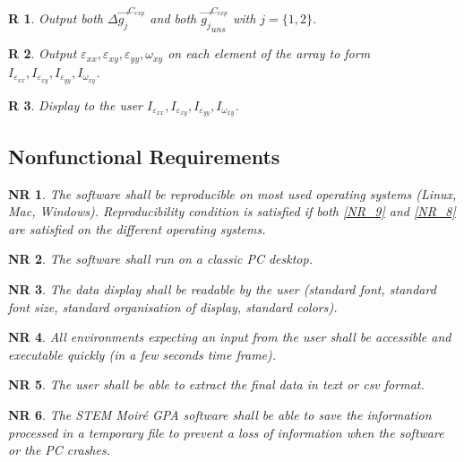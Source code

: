 \documentclass[12pt]{article}
\newcommand{\progname}{STEM Moir{\'e} GPA}
\newtheorem{R}{R}
\newtheorem{NR}{NR}
\begin{document}
\begin{R}
\label{R_12}
\normalfont Output both  $\Delta \overrightarrow{g_{j}}^{C_{exp}}$ and both $\overrightarrow{g_{j}}_{uns}^{C_{exp}}$ with $j=\{1,2\}$.
\end{R}
\begin{R}
\label{R_13}
\normalfont Output $\varepsilon_{xx},\varepsilon_{xy},\varepsilon_{yy},\omega_{xy}$ on each element of the array to form $I_{\varepsilon_{xx}},I_{\varepsilon_{xy}},I_{\varepsilon_{yy}},I_{\omega_{xy}}$.
\end{R}
\begin{R}
\label{R_14}
\normalfont Display to the user $I_{\varepsilon_{xx}},I_{\varepsilon_{xy}},I_{\varepsilon_{yy}},I_{\omega_{xy}}$.
\end{R}


\subsection{Nonfunctional Requirements}

\begin{NR}
\label{NR_1} 
\normalfont The software shall be reproducible on most used operating systems (Linux, Mac, Windows). Reproducibility condition is satisfied if both \cref{NR_9} and \cref{NR_8} are satisfied on the different operating systems. 
\end{NR}

\begin{NR}
\label{NR_2} 
\normalfont The software shall run on a classic PC desktop.
\end{NR}

\begin{NR}
\label{NR_3} 
\normalfont The data display shall be readable by the user (standard font, standard font size, standard organisation of display, standard colors).
\end{NR}

\begin{NR}
\label{NR_4} 
\normalfont All environments expecting an input from the user shall be accessible and executable quickly (in a few seconds time frame).
\end{NR}

\begin{NR}
\label{NR_5} 
\normalfont The user shall be able to extract the final data in text or csv format.
\end{NR}

\begin{NR}
\label{NR_6} 
\normalfont The \progname{} software shall be able to save the information processed in a temporary file to prevent a loss of information when the software or the PC crashes.
\end{NR}
\end{document}
